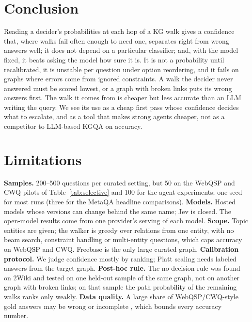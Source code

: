 \documentclass[11pt]{article}
\begin{document}
\section{Conclusion}

Reading a decider's probabilities at each hop of a KG walk gives a confidence that,
where walks fail often enough to need one, separates right from wrong answers well; it
does not depend on a particular classifier; and, with the model fixed, it beats asking
the model how sure it is. It is not a probability until recalibrated, it is unstable per
question under option reordering, and it fails on graphs where errors come from
ignored constraints. A walk the decider never answered must be scored lowest, or a graph
with broken links puts its wrong answers first. The walk it comes from is cheaper but less accurate than
an LLM writing the query. We see its use as a cheap first pass whose confidence decides
what to escalate, and as a tool that makes strong agents cheaper, not as a competitor
to LLM-based KGQA on accuracy.

\section*{Limitations}

\textbf{Samples.} 200--500 questions per curated setting, but 50 on the WebQSP and CWQ
pilots of Table~\ref{tab:selective} and 100 for the agent experiments; one seed for
most runs (three for the MetaQA headline comparisons). \textbf{Models.} Hosted models
whose versions can change behind the same name; Jev is closed. The open-model results
come from one provider's serving of each model. \textbf{Scope.} Topic entities are
given; the walker is greedy over relations from one entity, with no beam search,
constraint handling or multi-entity questions, which caps accuracy on WebQSP and CWQ.
Freebase is the only large curated graph. \textbf{Calibration protocol.} We judge
confidence mostly by ranking; Platt scaling needs labeled answers from the target graph.
\textbf{Post-hoc rule.} The no-decision rule was found on 2Wiki and tested on one
held-out sample of the same graph, not on another graph with broken links; on that
sample the path probability of the remaining walks ranks only weakly.
\textbf{Data quality.} A large share of WebQSP/CWQ-style gold answers may be wrong or
incomplete \citep{zhang2025kgqagen}, which bounds every accuracy number.
\end{document}
